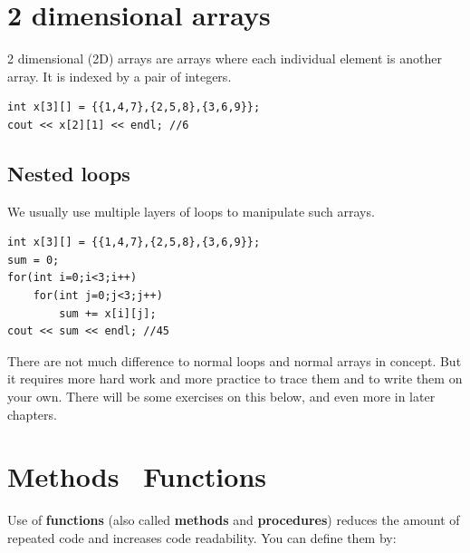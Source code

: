 




\section{2 dimensional arrays}

2 dimensional (2D) arrays are arrays where each individual element is another array. It is indexed by a pair of integers. 

\begin{lstlisting}
int x[3][] = {{1,4,7},{2,5,8},{3,6,9}};
cout << x[2][1] << endl; //6
\end{lstlisting}

\subsection{Nested loops}

We usually use multiple layers of loops to manipulate such arrays. 

\begin{lstlisting}
int x[3][] = {{1,4,7},{2,5,8},{3,6,9}};
sum = 0;
for(int i=0;i<3;i++)
    for(int j=0;j<3;j++)
        sum += x[i][j];
cout << sum << endl; //45
\end{lstlisting}

There are not much difference to normal loops and normal arrays in concept. But it requires more hard work and more practice to trace them and to write them on your own. There will be some exercises on this below, and even more in later chapters.

\section{\if{} Methods \else ~Functions \fi}
\label{sec:functions}

Use of \textbf{functions} (also called \textbf{methods} and \textbf{procedures}) reduces the amount of repeated code and increases code readability. You can define them by:

